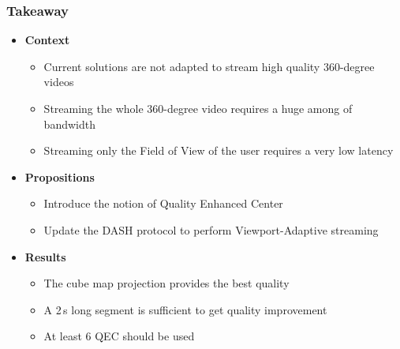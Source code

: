 \begin{frame}[c,label=Takeaway]
    \frametitle{Takeaway}
    \vfill
    \begin{itemize}[<+->]
        \item \textbf{Context}
        \begin{itemize}[<.->]
           \item Current solutions are not adapted to stream high quality 360-degree videos
           \item Streaming the whole 360-degree video requires a huge among of bandwidth
           \item Streaming only the Field of View of the user requires a very low latency
        \end{itemize}
    \end{itemize}
    \vfill
    \begin{itemize}[<+->]
        \item \textbf{Propositions}
        \begin{itemize}[<.->]
           \item Introduce the notion of Quality Enhanced Center
           \item Update the DASH protocol to perform Viewport-Adaptive streaming
        \end{itemize}
    \end{itemize}

    \vfill
    \begin{itemize}[<+->]
        \item \textbf{Results}
        \begin{itemize}[<.->]
           \item The cube map projection provides the best quality
           \item A 2\,s long segment is sufficient to get quality improvement
           \item At least 6 QEC should be used
        \end{itemize}
    \end{itemize}
    \vfill
    \setcounter{totalTakeawaySlides}{\valueBP}
\end{frame}


